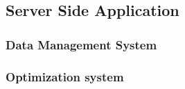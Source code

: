 \subsection{Server Side Application}
\label{sec:ssa_design}



\subsubsection{Data Management System}
\label{sec:dms_design}


\subsubsection{Optimization system}
\label{sec:os_design}

